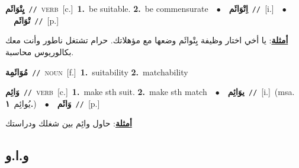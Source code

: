 \documentclass[10pt,a4paper,twoside]{article} %
\begin{document}
\begin{multicols}{2}
{\setlength\topsep{0pt}\textbf{\foreignlanguage{arabic}{يِتْوَائَم}}\ {\color{gray}\texttt{//}\color{black}}\ \textsc{verb}\ [c.]\ \textbf{1.}~be suitable.  \textbf{2.}~be commensurate\ \ $\bullet$\ \ \setlength\topsep{0pt}\textbf{\foreignlanguage{arabic}{اِتْوَائَم}}\ {\color{gray}\texttt{//}\color{black}}\ [i.]\ \ $\bullet$\ \ \setlength\topsep{0pt}\textbf{\foreignlanguage{arabic}{تْوَائَم}}\ {\color{gray}\texttt{//}\color{black}}\ [p.]\  \begin{flushright}\color{gray}\foreignlanguage{arabic}{\textbf{\underline{\foreignlanguage{arabic}{أمثلة}}}: يا أخي اختار وظيفة يِتْوائَم وضعها مع مؤهلاتك. حرام تشتغل ناطور وأنت معك بكالوريوس محاسبة.}\end{flushright}\color{black}} \vspace{2mm}

{\setlength\topsep{0pt}\textbf{\foreignlanguage{arabic}{مُوَائَمِة}}\ {\color{gray}\texttt{//}\color{black}}\ \textsc{noun}\ [f.]\ \textbf{1.}~suitability  \textbf{2.}~matchability\ 

{\setlength\topsep{0pt}\textbf{\foreignlanguage{arabic}{وَائِم}}\ {\color{gray}\texttt{//}\color{black}}\ \textsc{verb}\ [c.]\ \textbf{1.}~make sth suit.  \textbf{2.}~make sth match\ \ $\bullet$\ \ \setlength\topsep{0pt}\textbf{\foreignlanguage{arabic}{يوَائِم}}\ {\color{gray}\texttt{//}\color{black}}\ [i.]\ \color{gray}(msa. \foreignlanguage{arabic}{يُوائِم}~\foreignlanguage{arabic}{\textbf{١.}})\color{black}\ \ $\bullet$\ \ \setlength\topsep{0pt}\textbf{\foreignlanguage{arabic}{وَائَم}}\ {\color{gray}\texttt{//}\color{black}}\ [p.]\  \begin{flushright}\color{gray}\foreignlanguage{arabic}{\textbf{\underline{\foreignlanguage{arabic}{أمثلة}}}: حاول وائِم بين شغلك ودراستك}\end{flushright}\color{black}} \vspace{2mm}

\vspace{-3mm}
\subsection*{\color{blue}\foreignlanguage{arabic}{و.ا.و}\color{blue}{ (ntws)}} 

}
\end{multicols}
\end{document}
